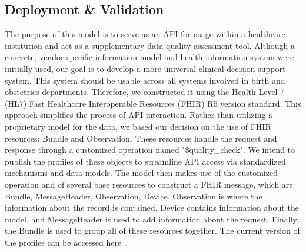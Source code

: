 \subsection{Deployment \& Validation}
The purpose of this model is to serve as an API for usage within a healthcare institution and act as a supplementary data quality assessment tool. Although a concrete, vendor-specific information model and health information system were initially used, our goal is to develop a more universal clinical decision support system. This system should be usable across all systems involved in birth and obstetrics departments. Therefore, we constructed it using the Health Level 7 (HL7) Fast Healthcare Interoperable Resources (FHIR) R5 version standard. This approach simplifies the process of API interaction. Rather than utilizing a proprietary model for the data, we based our decision on the use of FHIR resources: Bundle and Observation. These resources handle the request and response through a customized operation named "\$quality\_check". We intend to publish the profiles of these objects to streamline API access via standardized mechanisms and data models. The model then makes use of the customized operation and of several base resources to construct a FHIR message, which are: Bundle, MessageHeader, Observation, Device. Observation is where the information about the record is contained, Device contains information about the model, and MessageHeader is used to add information about the request. Finally, the Bundle is used to group all of these resources together. The current version of the profiles can be accessed here\unskip~\cite{obs-ig}. 

